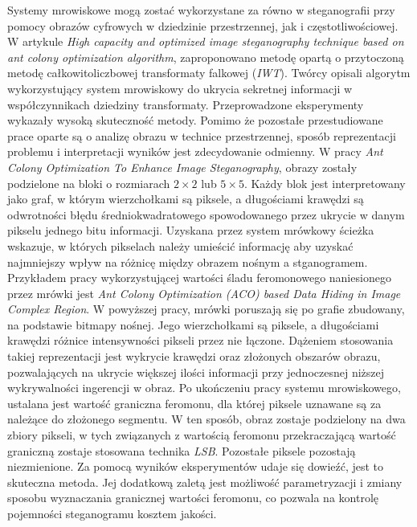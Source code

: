 {    %
    Systemy mrowiskowe mogą zostać wykorzystane za równo w steganografii przy pomocy obrazów cyfrowych w dziedzinie
    przestrzennej\cite{ZghaerACOStegEN, Khan2018AntCO}, jak i częstotliwościowej\cite{Priya2018HIGHCA}. W artykule
    \textit{High capacity and optimized image steganography technique based on ant colony optimization algorithm},
    zaproponowano metodę opartą o przytoczoną metodę całkowitoliczbowej transformaty falkowej (\textit{IWT}). Twórcy
    opisali algorytm wykorzystujący system mrowiskowy do ukrycia sekretnej informacji w współczynnikach dziedziny
    transformaty. Przeprowadzone eksperymenty wykazały wysoką skuteczność metody\cite{Priya2018HIGHCA}.
    Pomimo że pozostałe przestudiowane prace oparte są o analizę obrazu w technice przestrzennej, sposób reprezentacji
    problemu i interpretacji wyników jest zdecydowanie odmienny. W pracy \textit{Ant Colony Optimization To Enhance
    Image Steganography}\cite{ZghaerACOStegEN}, obrazy zostały podzielone na bloki o rozmiarach $2\times2$ lub
    $5\times5$. Każdy blok jest interpretowany jako graf, w którym wierzchołkami są piksele, a długościami krawędzi są
    odwrotności błędu średniokwadratowego spowodowanego przez ukrycie w danym pikselu jednego bitu informacji. Uzyskana
    przez system mrówkowy ścieżka wskazuje, w których pikselach należy umieścić informację aby uzyskać najmniejszy wpływ
    na różnicę między obrazem nośnym a stganogramem\cite{ZghaerACOStegEN}.
    Przykładem pracy wykorzystującej wartości śladu feromonowego naniesionego przez mrówki jest \textit{Ant Colony
    Optimization (ACO) based Data Hiding in Image Complex Region}\cite{Khan2018AntCO}. W powyższej pracy, mrówki
    poruszają się po grafie zbudowany, na podstawie bitmapy nośnej. Jego wierzchołkami są piksele, a długościami
    krawędzi różnice intensywności pikseli przez nie łączone. Dążeniem stosowania takiej reprezentacji jest wykrycie
    krawędzi oraz złożonych obszarów obrazu, pozwalających na ukrycie większej ilości informacji przy jednoczesnej
    niższej wykrywalności ingerencji w obraz. Po ukończeniu pracy systemu mrowiskowego, ustalana jest wartość graniczna
    feromonu, dla której piksele uznawane są za należące do złożonego segmentu. W ten sposób, obraz zostaje podzielony
    na dwa zbiory pikseli, w tych związanych z wartością feromonu przekraczającą wartość graniczną zostaje stosowana
    technika \textit{LSB}. Pozostałe piksele pozostają niezmienione. Za pomocą wyników eksperymentów udaje się dowieźć,
    jest to skuteczna metoda. Jej dodatkową zaletą jest możliwość parametryzacji i zmiany sposobu wyznaczania granicznej
    wartości feromonu, co pozwala na kontrolę pojemności steganogramu kosztem jakości\cite{Khan2018AntCO}.

}
